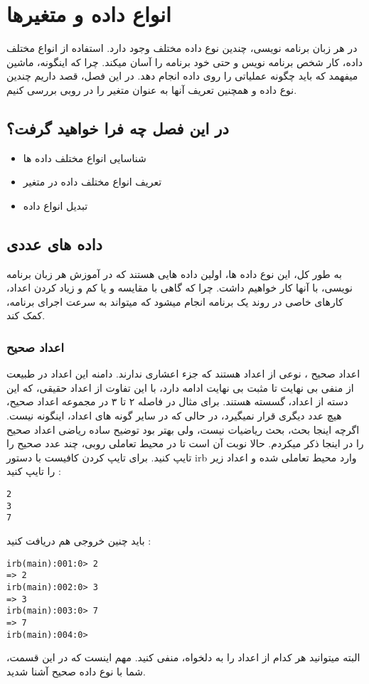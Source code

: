 \documentclass[11pt]{article}
\begin{document}
\section{انواع داده و متغیرها}
در هر زبان برنامه نویسی، چندین نوع داده مختلف وجود دارد. استفاده از انواع مختلف داده، کار شخص برنامه نویس و حتی خود برنامه را آسان میکند. چرا که اینگونه، ماشین میفهمد که باید چگونه عملیاتی را روی داده انجام دهد. در این فصل، قصد داریم چندین نوع داده و همچنین تعریف آنها به عنوان متغیر را در روبی بررسی کنیم. 
\subsection{در این فصل چه فرا خواهید گرفت؟}
\begin{itemize}
\item شناسایی انواع مختلف داده ها
\item تعریف انواع مختلف داده در متغیر
\item تبدیل انواع داده
\end{itemize}
\subsection{داده های عددی}
به طور کل، این نوع داده ها، اولین داده هایی هستند که در آموزش هر زبان برنامه نویسی، با آنها کار خواهیم داشت. چرا که گاهی با مقایسه و یا کم و زیاد کردن اعداد، کارهای خاصی در روند یک برنامه انجام میشود که میتواند به سرعت اجرای برنامه، کمک کند. 
\subsubsection{اعداد صحیح}
اعداد صحیح
، نوعی از اعداد هستند که جزء اعشاری ندارند. دامنه این اعداد در طبیعت از منفی بی نهایت تا مثبت بی نهایت ادامه دارد، با این تفاوت از اعداد حقیقی، که این دسته از اعداد، گسسته هستند. برای مثال در فاصله ۲ تا ۳ در مجموعه اعداد صحیح، هیچ عدد دیگری قرار نمیگیرد، در حالی که در سایر گونه های اعداد، اینگونه نیست. اگرچه اینجا بحث، بحث ریاضیات نیست، ولی بهتر بود توضیح ساده ریاضی اعداد صحیح را در اینجا ذکر میکردم. حالا نوبت آن است تا در محیط تعاملی روبی، چند عدد صحیح را تایپ کنید. برای تایپ کردن کافیست با دستور irb وارد محیط تعاملی شده و اعداد زیر را تایپ کنید :
\begin{latin}
\begin{verbatim}
2
3
7
\end{verbatim}
\end{latin}
باید چنین خروجی هم دریافت کنید :
\begin{latin}
\begin{verbatim}
irb(main):001:0> 2
=> 2
irb(main):002:0> 3
=> 3
irb(main):003:0> 7
=> 7
irb(main):004:0> 
\end{verbatim}
\end{latin}
البته میتوانید هر کدام از اعداد را به دلخواه، منفی کنید. مهم اینست که در این قسمت، شما با نوع داده صحیح آشنا شدید. 
\end{document}
